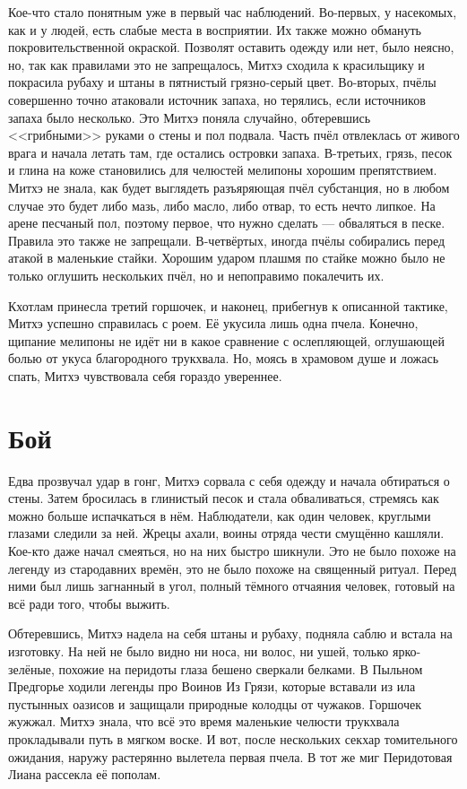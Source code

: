 Кое-что стало понятным уже в первый час наблюдений.
Во-первых, у насекомых, как и у людей, есть слабые места в восприятии.
Их также можно обмануть покровительственной окраской.
Позволят оставить одежду или нет, было неясно, но, так как правилами это не запрещалось, Митхэ сходила к красильщику и покрасила рубаху и штаны в пятнистый грязно-серый цвет.
Во-вторых, пчёлы совершенно точно атаковали источник запаха, но терялись, если источников запаха было несколько.
Это Митхэ поняла случайно, обтеревшись <<грибными>> руками о стены и пол подвала.
Часть пчёл отвлеклась от живого врага и начала летать там, где остались островки запаха.
В-третьих, грязь, песок и глина на коже становились для челюстей мелипоны хорошим препятствием.
Митхэ не знала, как будет выглядеть разъяряющая пчёл субстанция, но в любом случае это будет либо мазь, либо масло, либо отвар, то есть нечто липкое.
На арене песчаный пол, поэтому первое, что нужно сделать --- обваляться в песке.
Правила это также не запрещали.
В-четвёртых, иногда пчёлы собирались перед атакой в маленькие стайки.
Хорошим ударом плашмя по стайке можно было не только оглушить нескольких пчёл, но и непоправимо покалечить их.

Кхотлам принесла третий горшочек, и наконец, прибегнув к описанной тактике, Митхэ успешно справилась с роем.
Её укусила лишь одна пчела.
Конечно, щипание мелипоны не идёт ни в какое сравнение с ослепляющей, оглушающей болью от укуса благородного трукхвала.
Но, моясь в храмовом душе и ложась спать, Митхэ чувствовала себя гораздо увереннее.

\section{Бой}

Едва прозвучал удар в гонг, Митхэ сорвала с себя одежду и начала обтираться о стены.
Затем бросилась в глинистый песок и стала обваливаться, стремясь как можно больше испачкаться в нём.
Наблюдатели, как один человек, круглыми глазами следили за ней.
Жрецы ахали, воины отряда чести смущённо кашляли.
Кое-кто даже начал смеяться, но на них быстро шикнули.
Это не было похоже на легенду из стародавних времён, это не было похоже на священный ритуал.
Перед ними был лишь загнанный в угол, полный тёмного отчаяния человек, готовый на всё ради того, чтобы выжить.

Обтеревшись, Митхэ надела на себя штаны и рубаху, подняла саблю и встала на изготовку.
На ней не было видно ни носа, ни волос, ни ушей, только ярко-зелёные, похожие на перидоты глаза бешено сверкали белками.
В Пыльном Предгорье ходили легенды про Воинов Из Грязи, которые вставали из ила пустынных оазисов и защищали природные колодцы от чужаков.
Горшочек жужжал.
Митхэ знала, что всё это время маленькие челюсти трукхвала прокладывали путь в мягком воске.
И вот, после нескольких секхар томительного ожидания, наружу растерянно вылетела первая пчела.
В тот же миг Перидотовая Лиана рассекла её пополам.

